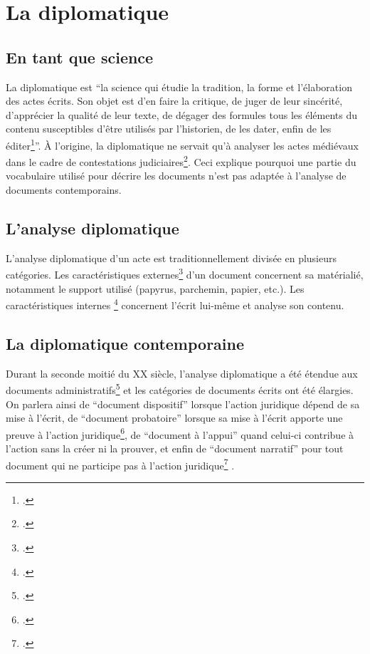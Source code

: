 
\section{La diplomatique}

\subsection{En tant que science}
La diplomatique est \enquote{la science qui étudie la tradition, la forme et l'élaboration des actes écrits. Son objet est d'en faire la critique, de juger de leur sincérité, d'apprécier la qualité de leur texte, de dégager des formules tous les éléments du contenu susceptibles d'être utilisés par l'historien, de les dater, enfin de les éditer\footcite[p.~21]{VocArchivistique1997}}. À l'origine, la diplomatique ne servait qu'à analyser les actes médiévaux dans le cadre de contestations judiciaires\footcite[p.~604]{Duranti2003}. Ceci explique pourquoi une partie du vocabulaire utilisé pour décrire les documents n'est pas adaptée à l'analyse de documents contemporains.  


\subsection{L'analyse diplomatique}
L'analyse diplomatique d'un acte est traditionnellement divisée en plusieurs catégories. Les caractéristiques externes\footcite[p.~45-50]{VocArchivistique1997} d'un document concernent sa matérialié, notamment le support utilisé (papyrus, parchemin, papier, etc.). Les caractéristiques internes \footcite[p.~51-68]{VocArchivistique1997} concernent l'écrit lui-même et analyse son contenu.  


\subsection{La diplomatique contemporaine}
Durant la seconde moitié du XX\ieme{} siècle, l'analyse diplomatique a été étendue aux documents administratifs\footcite[p.~604-605]{Duranti2003} et les catégories de documents écrits ont été élargies. On parlera ainsi de \enquote{document dispositif} lorsque l'action juridique dépend de sa mise à l'écrit, de \enquote{document probatoire} lorsque sa mise à l'écrit apporte une preuve à l'action juridique\footcite[p.~22]{VocArchivistique1997}, de \enquote{document à l'appui} quand celui-ci contribue à l'action sans la créer ni la prouver, et enfin de \enquote{document narratif} pour tout document qui ne participe pas à l'action juridique\footcite[p.~605]{Duranti2003}  .



